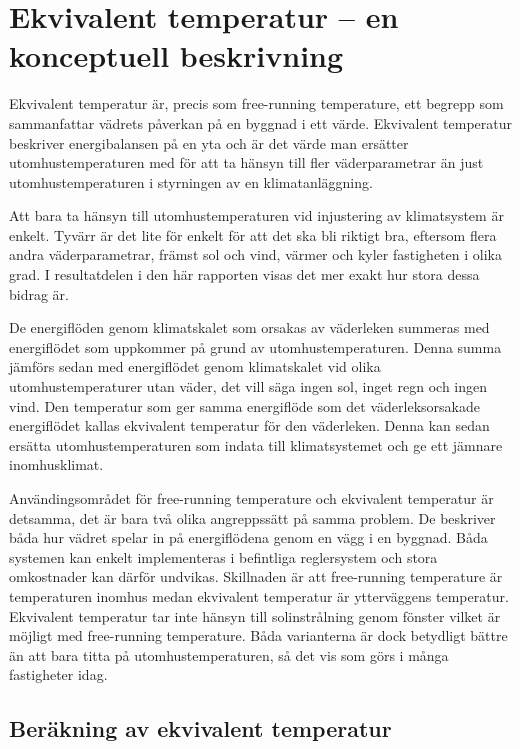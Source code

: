 \section{Ekvivalent temperatur  – en konceptuell beskrivning}
\label{sec:ekv_temp}

Ekvivalent temperatur är, precis som free-running temperature, ett begrepp som sammanfattar vädrets påverkan på en byggnad i ett värde. Ekvivalent temperatur beskriver energibalansen på en yta och är det värde man ersätter utomhustemperaturen med för att ta 
hänsyn till fler väderparametrar än just utomhustemperaturen i styrningen av en 
klimatanläggning.

Att bara ta hänsyn till utomhustemperaturen vid injustering av klimatsystem är enkelt. 
Tyvärr är det lite för enkelt för att det ska bli riktigt bra, eftersom flera andra 
väderparametrar, främst sol och vind, värmer och kyler fastigheten i olika grad. I resultatdelen i den här rapporten visas det mer exakt hur stora dessa bidrag är.

De energiflöden genom klimatskalet som orsakas av väderleken summeras med energiflödet som uppkommer på grund av utomhustemperaturen. Denna summa jämförs sedan med energiflödet genom klimatskalet vid olika utomhustemperaturer utan väder, det vill säga ingen sol, inget regn och ingen vind. Den temperatur som ger 
samma energiflöde som det väderleksorsakade energiflödet kallas ekvivalent temperatur för den väderleken. Denna kan sedan ersätta 
utomhustemperaturen som indata till klimatsystemet och ge ett jämnare inomhusklimat. 

Användingsområdet för free-running temperature och ekvivalent temperatur är detsamma, det är bara två olika angreppssätt på samma problem. De beskriver båda hur vädret spelar in på energiflödena genom en vägg i en byggnad.  Båda systemen kan enkelt implementeras i befintliga reglersystem och stora omkostnader kan därför undvikas. Skillnaden är att free-running temperature är temperaturen inomhus medan ekvivalent temperatur är ytterväggens temperatur. Ekvivalent temperatur tar inte hänsyn till solinstrålning genom fönster vilket är möjligt med free-running temperature. Båda varianterna är dock betydligt bättre än att bara titta på utomhustemperaturen, så det vis som görs i många fastigheter idag.

\subsection{Beräkning av ekvivalent temperatur}

